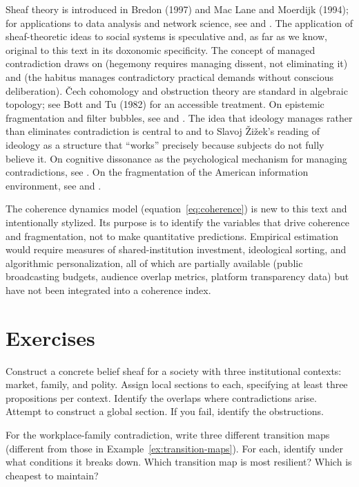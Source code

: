 Sheaf theory is introduced in Bredon (1997) and Mac Lane and Moerdijk (1994); for applications to data analysis and network science, see \textcite{ghrist2014} and \textcite{curry2014}.
The application of sheaf-theoretic ideas to social systems is speculative and, as far as we know, original to this text in its doxonomic specificity.
The concept of managed contradiction draws on \textcite{gramsci1971} (hegemony requires managing dissent, not eliminating it) and \textcite{bourdieu1984} (the habitus manages contradictory practical demands without conscious deliberation).
\v{C}ech cohomology and obstruction theory are standard in algebraic topology; see Bott and Tu (1982) for an accessible treatment.
On epistemic fragmentation and filter bubbles, see \textcite{sunstein2017} and \textcite{benkler2018}.
The idea that ideology manages rather than eliminates contradiction is central to \textcite{adorno1944} and to Slavoj \v{Z}i\v{z}ek's reading of ideology as a structure that ``works'' precisely because subjects do not fully believe it.
On cognitive dissonance as the psychological mechanism for managing contradictions, see \textcite{festinger1957}.
On the fragmentation of the American information environment, see \textcite{benkler2018} and \textcite{hallin2004}.

The coherence dynamics model (equation~\ref{eq:coherence}) is new to this text and intentionally stylized.
Its purpose is to identify the variables that drive coherence and fragmentation, not to make quantitative predictions.
Empirical estimation would require measures of shared-institution investment, ideological sorting, and algorithmic personalization, all of which are partially available (public broadcasting budgets, audience overlap metrics, platform transparency data) but have not been integrated into a coherence index.


\section{Exercises}

\begin{exercise}
Construct a concrete belief sheaf for a society with three institutional contexts: market, family, and polity.
Assign local sections to each, specifying at least three propositions per context.
Identify the overlaps where contradictions arise.
Attempt to construct a global section.
If you fail, identify the obstructions.
\end{exercise}

\begin{exercise}
For the workplace-family contradiction, write three different transition maps (different from those in Example~\ref{ex:transition-maps}).
For each, identify under what conditions it breaks down.
Which transition map is most resilient?
Which is cheapest to maintain?
\end{exercise}

